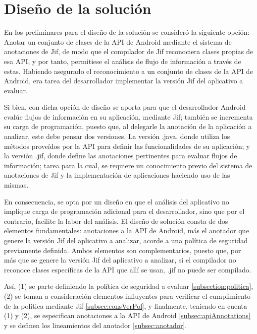
\section{Diseño de la solución}
En los preliminares para el diseño de la solución se consideró la siguiente
opción: Anotar un conjunto de clases de la API de Android mediante el sistema de
anotaciones de Jif, de modo que el compilador de Jif reconociera clases propias
de esa API, y por tanto, permitiese el análisis de flujo de información a través
de estas. Habiendo asegurado el reconocimiento a un
conjunto de clases de la API de Android, era tarea del desarrollador implementar
la versión Jif del aplicativo a evaluar.

Si bien, con dicha opción de diseño se aporta para que el desarrollador
Android evalúe flujos de información en su aplicación, mediante Jif; también se
incrementa su carga de programación, puesto que, al delegarle la anotación de la
aplicación a analizar, este debe pensar dos versiones. La versión .java, donde
utiliza los métodos proveídos por la API para definir las funcionalidades de su
aplicación; y la versión .jif, donde define las anotaciones pertinentes para
evaluar flujos de información; tarea para la cual, se requiere un conocimiento
previo del sistema de anotaciones de Jif y la implementación de aplicaciones
haciendo uso de las mismas.

En consecuencia, se opta por un diseño en que el análisis del aplicativo no
implique carga de programación adicional para el desarrollador, sino que por el
contrario, facilite la labor del análisis.\newline 
El diseño de solución consta de dos elementos fundamentales: anotaciones a la
API de Android, más el anotador que genere la versión Jif del aplicativo a
analizar, acorde a una política de seguridad previamente definida.\newline
Ambos elementos son complementarios, puesto que, por más que se genere la
versión Jif del aplicativo a analizar, si el compilador no reconoce clases
específicas de la API que allí se usan, .jif no puede ser compilado.

Así, (1) se parte definiendo la política de seguridad a evaluar
\ref{subsection:politica}, (2) se toman a consideración elementos influyentes
para verificar el cumplimiento de la política mediante Jif
\ref{subsec:consVerPol}, y finalmente, teniendo en cuenta (1) y (2), se
especifican anotaciones a la API de Android \ref{subsec:apiAnnotations} y se
definen los lineamientos del anotador \ref{subsec:anotador}.

